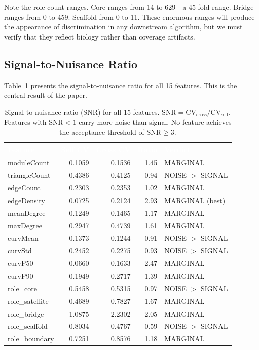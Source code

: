\documentclass{../yalumba}
\begin{document}

Note the role count ranges.  Core ranges from 14 to 629---a 45-fold
range.  Bridge ranges from 0 to 459.  Scaffold from 0 to 11.  These
enormous ranges will produce the appearance of discrimination in any
downstream algorithm, but we must verify that they reflect biology
rather than coverage artifacts.

\subsection{Signal-to-Nuisance Ratio}
\label{sec:snr}

Table~\ref{tab:snr} presents the signal-to-nuisance ratio for all 15
features.  This is the central result of the paper.

\begin{table}[htbp]
\centering
\tablestyle
\caption{Signal-to-nuisance ratio (SNR) for all 15 features.
$\text{SNR} = \text{CV}_{\text{cross}} / \text{CV}_{\text{self}}$.
Features with $\text{SNR} < 1$ carry more noise than signal.  No
feature achieves the acceptance threshold of $\text{SNR} \geq 3$.}
\label{tab:snr}
\begin{tabular}{@{}lrrrl@{}}
\toprule
\rowcolor{table-header}
\textcolor{white}{\textbf{Feature}} &
\textcolor{white}{\textbf{Self CV}} &
\textcolor{white}{\textbf{Cross CV}} &
\textcolor{white}{\textbf{Ratio}} &
\textcolor{white}{\textbf{Verdict}} \\
\midrule
moduleCount     & 0.1059 & 0.1536 & 1.45 & MARGINAL \\
triangleCount   & 0.4386 & 0.4125 & 0.94 & NOISE $>$ SIGNAL \\
edgeCount       & 0.2303 & 0.2353 & 1.02 & MARGINAL \\
edgeDensity     & 0.0725 & 0.2124 & 2.93 & MARGINAL (best) \\
meanDegree      & 0.1249 & 0.1465 & 1.17 & MARGINAL \\
maxDegree       & 0.2947 & 0.4739 & 1.61 & MARGINAL \\
curvMean        & 0.1373 & 0.1244 & 0.91 & NOISE $>$ SIGNAL \\
curvStd         & 0.2452 & 0.2275 & 0.93 & NOISE $>$ SIGNAL \\
curvP50         & 0.0660 & 0.1633 & 2.47 & MARGINAL \\
curvP90         & 0.1949 & 0.2717 & 1.39 & MARGINAL \\
role\_core       & 0.5458 & 0.5315 & 0.97 & NOISE $>$ SIGNAL \\
role\_satellite  & 0.4689 & 0.7827 & 1.67 & MARGINAL \\
role\_bridge     & 1.0875 & 2.2302 & 2.05 & MARGINAL \\
role\_scaffold   & 0.8034 & 0.4767 & 0.59 & NOISE $>$ SIGNAL \\
role\_boundary   & 0.7251 & 0.8576 & 1.18 & MARGINAL \\
\bottomrule
\end{tabular}
\end{table}
\end{document}
